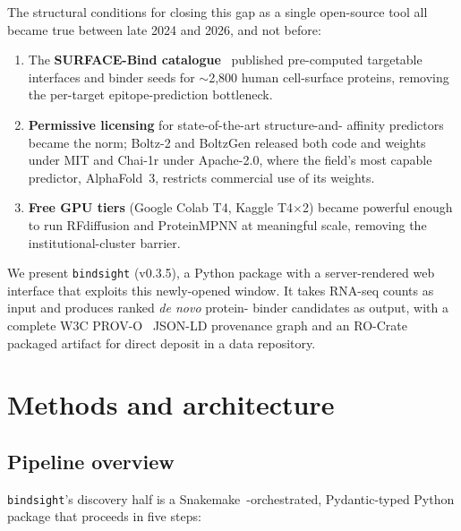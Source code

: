 \documentclass[11pt,letterpaper]{article}
\begin{document}
The structural conditions for closing this gap as a single open-source tool
all became true between late 2024 and 2026, and not before:

\begin{enumerate}
  \item The \textbf{SURFACE-Bind catalogue}~\cite{Balbi2026} published
        pre-computed targetable interfaces and binder seeds for $\sim$2{,}800
        human cell-surface proteins, removing the per-target epitope-prediction
        bottleneck.
  \item \textbf{Permissive licensing} for state-of-the-art structure-and-
        affinity predictors became the norm; Boltz-2 and BoltzGen released
        both code and weights under MIT and Chai-1r under Apache-2.0, where
        the field's most capable predictor, AlphaFold~3, restricts commercial
        use of its weights.
  \item \textbf{Free GPU tiers} (Google Colab T4, Kaggle T4$\times$2)
        became powerful enough to run RFdiffusion and ProteinMPNN at
        meaningful scale, removing the institutional-cluster barrier.
\end{enumerate}

We present \texttt{bindsight} (v0.3.5), a Python package with a
server-rendered web interface that exploits this newly-opened window. It
takes RNA-seq counts as input and produces ranked \textit{de novo} protein-
binder candidates as output, with a complete W3C PROV-O~\cite{PROVO}
JSON-LD provenance graph and an RO-Crate~\cite{SoilandReyes2022} packaged
artifact for direct deposit in a data repository.

\section{Methods and architecture}

\subsection{Pipeline overview}

\texttt{bindsight}'s discovery half is a Snakemake~\cite{Molder2021}-orchestrated,
Pydantic-typed Python package that proceeds in five steps:
\end{document}

